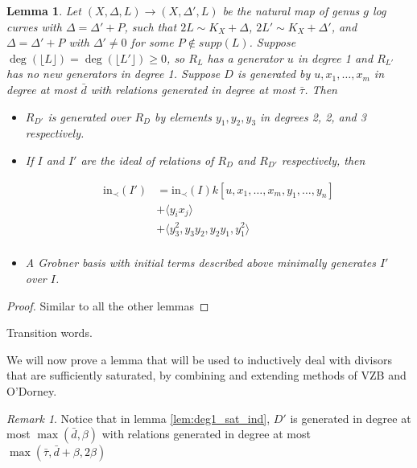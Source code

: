 \documentclass{amsart}
\theoremstyle{plain}
\newtheorem{lem}[thm]{Lemma}
\theoremstyle{definition}
\theoremstyle{remark}
\newtheorem{rem}[thm]{Remark}
\numberwithin{equation}{section}
\newcommand \halfcan{L}
\newcommand \initial{\text{in}}
\begin{document}
\begin{lem}\label{lem:add_point_effective_divisor_no_deg_1_generators}
Let $(X,\Delta,\halfcan)\to (X,\Delta',\halfcan)$ be the natural map of genus $g$ log curves with $\Delta=\Delta'+P$, such that $2\halfcan\sim K_X+\Delta$, $2\halfcan'\sim K_X+\Delta'$, and $\Delta=\Delta'+P$ with $\Delta'\ne 0$ for some $P\not\in supp(\halfcan)$.  
Suppose $\deg(\lfloor{\halfcan}\rfloor)=\deg(\lfloor \halfcan'\rfloor)\ge 0$, so $R_{\halfcan}$ has a
generator $u$ in degree 1 and $R_{\halfcan'}$ has no new generators in degree 1.  Suppose $D$ is generated by $u, x_1, \ldots, x_m$ in degree at most $\bar{d}$ with relations generated 
in degree at most $\bar{\tau}$.
Then 
\begin{itemize}
\item $R_{D'}$ is generated over $R_D$ by elements $y_1, y_2, y_3$ in degrees 2, 2, and 3 respectively.  
\item If $I$ and $I'$ are the ideal of relations of $R_D$ and $R_{D'}$ respectively, then 

\begin{align*}
	\initial_\prec(I') &= \initial_\prec(I) k[u, x_1, \ldots, x_m, y_1, \ldots, y_n] \\
										 &+ \langle y_i x_j \rangle \\
										 &+ \langle y_3^2, y_3y_2, y_2y_1, y_1^2\rangle \\
\end{align*}
\item A Grobner basis with initial terms described above minimally generates $I'$ over $I$.
\end{itemize}
\end{lem}
\begin{proof}
Similar to all the other lemmas
\end{proof}

Transition words.

We will now prove a lemma that will be used to inductively deal with divisors that are sufficiently saturated, by combining and extending methods of VZB  and O'Dorney.

\begin{rem}\label{rem:deg1_sat_ind_gen_rel_degrees}
Notice that in lemma \ref{lem:deg1_sat_ind}, $D'$ is generated in degree at most $\max(\bar{d}, \beta)$ with relations generated in degree at most $\max(\bar{\tau}, \bar{d} + \beta, 2 \beta)$
\end{rem}
\end{document}

